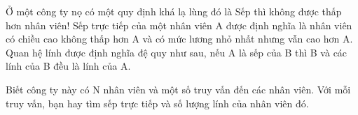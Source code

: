 Ở một công ty nọ có một quy định khá lạ lùng đó là Sếp thì không được thấp hơn nhân viên! Sếp trực tiếp của một nhân viên A được định nghĩa là nhân viên có chiều cao không thấp hơn A và có mức lương nhỏ nhất nhưng vẫn cao hơn A. Quan hệ lính được định nghĩa đệ quy như sau, nếu A là sếp của B thì B và các lính của B đều là lính của A.  

   Biết công ty này có N nhân viên và một số truy vấn đến các nhân viên. Với mỗi truy vấn, bạn hay tìm sếp trực tiếp và số lượng lính của nhân viên đó.  

\